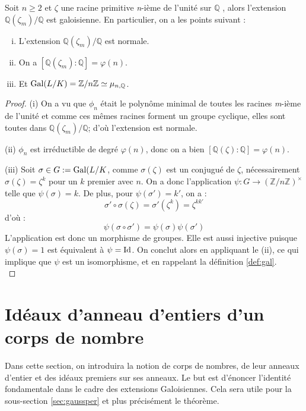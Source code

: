 \documentclass[a4paper]{article} %
\numberwithin{section}{part}
\numberwithin{equation}{section}
\newcommand\nroot[1]{\textit{#1}-ième}
\newcommand\zmodn[1]{\mathbb{Z}/#1\mathbb{Z}}
\newcommand\zmodninv[1]{(\mathbb{Z}/#1\mathbb{Z})^{\times}}
\newcommand\QQ{\mathbb{Q}}
\begin{document}
\begin{prop}
Soit $n \geq 2$ et $\zeta$ une racine primitive \nroot{n} de l'unité sur $\QQ$
, alors l'extension $\QQ(\zeta_m)/\QQ$ est galoisienne. En particulier, on a 
les points suivant :

\begin{enumerate}[(i)]
\item L'extension $\QQ(\zeta_m)/\QQ$ est normale.

\item On a $[\QQ(\zeta_m):\QQ] = \varphi(n)$.

\item Et $\textup{Gal}(L/K) = \zmodn{n} \simeq \mu_{n,\QQ}$.
\end{enumerate}
\end{prop}
\begin{proof}
(i) On a vu que $\phi_n$ était le polynôme minimal de toutes les racines 
\nroot{m} de l'unité et comme ces mêmes racines forment un groupe 
cyclique, elles sont toutes dans $\QQ(\zeta_m)/\QQ$; d'où l'extension est
normale.\par
(ii) $\phi_n$ est irréductible de degré $\varphi(n)$, donc on a bien
$[\QQ(\zeta):\QQ] = \varphi(n)$.\par
(iii) Soit $\sigma\in G := \textup{Gal}(L/K$, comme $\sigma(\zeta)$ est un
conjugué de $\zeta$, nécessairement $\sigma(\zeta) = \zeta^k$ pour un $k$
premier avec $n$. On a donc l'application $\psi : G \to \zmodninv{n}$ telle que
$\psi(\sigma) = k$. De plus, pour $\psi(\sigma') = k'$, on a :
\[\sigma'\circ\sigma(\zeta) = \sigma'(\zeta^k) = \zeta^{kk'}\]
d'où :
\[\psi(\sigma\circ\sigma') = \psi(\sigma)\psi(\sigma')\]
L'application est donc un morphisme de groupes. Elle est aussi injective puisque
$\psi(\sigma) = 1$ est équivalent à $\psi = \textup{Id}$. On conclut alors en
appliquant le (ii), ce qui implique que $\psi$ est un isomorphisme, et en 
rappelant la définition \ref{def:gal}.\\
\end{proof}

\section{Idéaux d'anneau d'entiers d'un corps de nombre}
Dans cette section, on introduira la notion de corps de nombres, de leur
anneaux d'entier et des idéaux premiers sur ses anneaux. Le but est d'énoncer 
l'identité fondamentale dans le cadre des extensions Galoisiennes. Cela sera 
utile pour la sous-section \ref{sec:gaussper} et plus précisément le 
théorème. %
\end{document}

